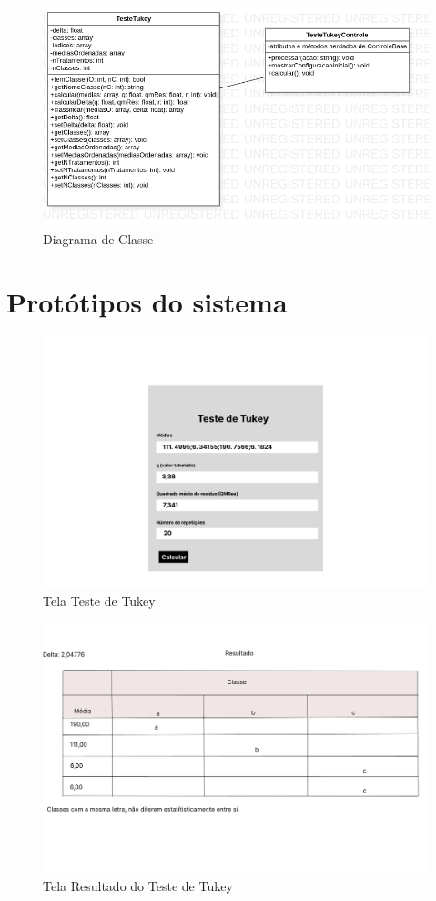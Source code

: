 \begin{figure}[H]
  \centering
  \includegraphics[width=0.8\linewidth]{imagens/classes.png} 
  \caption{Diagrama de Classe}
  \label{fig:exemplo}
\end{figure}

\chapter{Protótipos do sistema}


\begin{figure}[H]
  \centering
  \includegraphics[width=0.8\linewidth]{imagens/tela1.png} 
  \caption{Tela Teste de Tukey}
  \label{fig:exemplo}
\end{figure}

\begin{figure}[H]
  \centering
  \includegraphics[width=0.8\linewidth]{imagens/tela2.png}
  \caption{Tela Resultado do Teste de Tukey}
  \label{fig:exemplo}
\end{figure}
